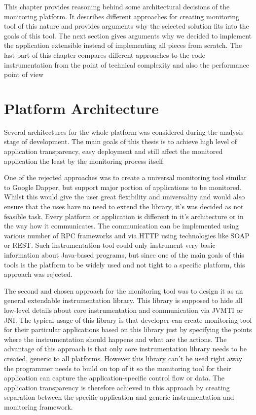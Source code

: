 This chapter provides reasoning behind some architectural decisions of the monitoring platform. It describes different approaches for creating monitoring tool of this nature and provides arguments why the selected solution fits into the goals of this tool. The next section gives arguments why we decided to implement the application extensible instead of implementing all pieces from scratch. The last part of this chapter compares different approaches to the code instrumentation from the point of technical complexity and also the performance point of view

\section{Platform Architecture}
Several architectures for the whole platform was considered during the analysis stage of development. The main goals of this thesis is to achieve high level of application transparency, easy deployment and still affect the monitored application the least by the monitoring process itself.

One of the rejected approaches was to create a universal monitoring tool similar to Google Dapper, but support major portion of applications to be monitored. Whilst this would give the user great flexibility and universality and would also ensure that the uses have no need to extend the library, it's was decided as not feasible task. Every platform or application is different in it's architecture or in the way how it communicates. The communication can be implemented using various number of RPC frameworks and via HTTP using technologies like SOAP or REST.
Such instrumentation tool could only instrument very basic information about Java-based programs, but since one of the main goals of this tools is the platform to be widely used and not tight to a specific platform, this approach was rejected.

The second and chosen approach for the monitoring tool was to design it as an general extendable instrumentation library. This library is supposed to hide all low-level details about core instrumentation and communication via JVMTI or JNI. The typical usage of this library is that developer can create monitoring tool for their particular applications based on this library just by specifying the points where the instrumentation should happens and what are the actions. The advantage of this approach is that only core instrumentation library needs to be created, generic to all platforms. However this library can't be used right away the programmer needs to build on top of it  so the monitoring tool for their application can capture the application-specific control flow or data. The application transparency is therefore achieved in this approach by creating separation between the specific application and generic instrumentation and monitoring framework.

